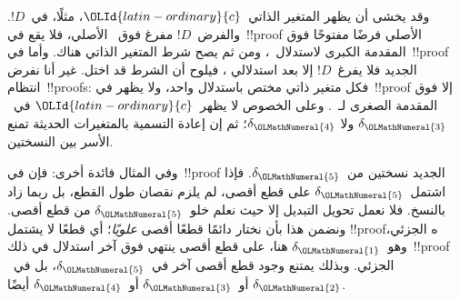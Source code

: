 \documentclass[../../../include/open-logic-section]{subfiles}
\begin{document}
وقد يخشى أن يظهر المتغير الذاتي~${\OLId{latin-ordinary}{c}}$، مثلًا، في~$!D$. والفرض~$!D$ مفرغ
فوق~\Elim{\lexists} الأصلي، فلا يقع في~!!{proof} الأصلي فرضًا مفتوحًا
فوق المقدمة الكبرى لاستدلال~\Elim{\lexists}، ومن ثم يصح شرط المتغير
الذاتي هناك. وأما في~!!{proof} الجديد فلا يفرغ~$!D$ إلا بعد استدلالي
\Elim{\lexists}، فيلوح أن الشرط قد اختل. غير أنا نفرض انتظام~!!{proof}s:
فكل متغير ذاتي مختص باستدلال واحد، ولا يظهر في~!!{proof} إلا فوق المقدمة
الصغرى لـ~\Elim{\lexists}. وعلى الخصوص لا يظهر~${\OLId{latin-ordinary}{c}}$ في~$\delta_{\OLMathNumeral{3}}$ ولا
$\delta_{\OLMathNumeral{4}}$؛ ثم إن إعادة التسمية بالمتغيرات الحديثة تمنع الأسر بين
النسختين.

وفي المثال فائدة أخرى: فإن في~!!{proof} الجديد نسختين من~$\delta_{\OLMathNumeral{5}}$.
فإذا اشتمل~$\delta_{\OLMathNumeral{5}}$ على قطع أقصى، لم يلزم نقصان طول القطع، بل ربما زاد
بالنسخ. فلا نعمل تحويل التبديل إلا حيث نعلم خلو~$\delta_{\OLMathNumeral{5}}$ من قطع أقصى.
ونضمن هذا بأن نختار دائمًا قطعًا أقصى \emph{علويًا}؛ أي قطعًا لا يشتمل
!!{proof}ه الجزئي، وهو~$\delta_{\OLMathNumeral{1}}$ هنا، على قطع أقصى ينتهي فوق آخر استدلال
في ذلك~!!{proof} الجزئي. وبذلك يمتنع وجود قطع أقصى آخر في~$\delta_{\OLMathNumeral{5}}$، بل
في~$\delta_{\OLMathNumeral{2}}$ أو~$\delta_{\OLMathNumeral{3}}$ أو~$\delta_{\OLMathNumeral{4}}$ أيضًا.
\end{document}
